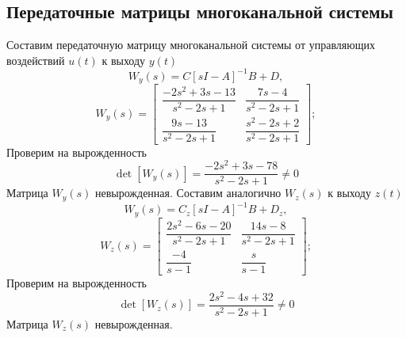 \documentclass[a4paper, 12pt]{article}
\begin{document}
    \subsection{Передаточные матрицы многоканальной системы}
    Составим передаточную матрицу многоканальной системы от управляющих
    воздействий $u(t)$ к выходу $y(t)$
    $$
    W_y(s)=C\left[ sI-A \right]^{-1}B+D,
    $$
    $$
    W_y(s)=\begin{bmatrix}
        \dfrac{-2s^2+3s-13}{s^2-2s+1}	    &\dfrac{7s-4}{s^2-2s+1}\\
       \dfrac{9s-13}{s^2-2s+1}	&\dfrac{s^2-2s+2}{s^2-2s+1}
    \end{bmatrix};
    $$
    Проверим на вырожденность
    $$
    \det\left[ W_y(s) \right]=\dfrac{-2s^2+3s-78}{s^2-2s+1}\neq0
    $$
    Матрица $W_y(s)$ невырожденная. Составим аналогично $W_z(s)$ к выходу $z(t)$
    $$
    W_y(s)=C_z\left[ sI-A \right]^{-1}B+D_z,
    $$
    $$
    W_z(s)=\begin{bmatrix}
        \dfrac{2s^2-6s-20}{s^2-2s+1}	&\dfrac{14s-8}{s^2-2s+1}\\
                  \dfrac{-4}{s-1}	             &\dfrac{s}{s-1}
    \end{bmatrix};
    $$
    Проверим на вырожденность
    $$
    \det\left[ W_z(s) \right]=\dfrac{2s^2-4s+32}{s^2-2s+1}\neq0
    $$
    Матрица $W_z(s)$ невырожденная.
\end{document}
